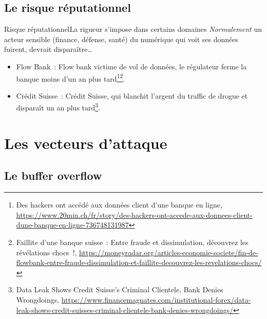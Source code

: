 \documentclass{beamer}
\begin{document}
    \subsection{Le risque réputationnel}\label{subsec:risque-reputationnel}
    \begin{frame}{Risque réputationnel}{La rigueur s'impose dans certains domaines}
        \textit{Normalement} un acteur sensible (finance, défense, santé) du numérique qui voit ses données fuirent, devrait disparaître\ldots
        \begin{itemize}
            \item Flow Bank~: Flow bank victime de vol de données, le régulateur ferme la banque moins d'un an plus tard\footnote{Des hackers ont accédé aux données client d’une banque en ligne, \url{https://www.20min.ch/fr/story/des-hackers-ont-accede-aux-donnees-client-dune-banque-en-ligne-736748131987}}\footnotestep\footnote{Faillite d’une banque suisse~: Entre fraude et dissimulation, découvrez les révélations chocs~!, \url{https://moneyradar.org/articles-economie-societe/fin-de-flowbank-entre-fraude-dissimulation-et-faillite-decouvrez-les-revelations-chocs/}}.
            \item Crédit Suisse~: Crédit Suisse, qui blanchit l'argent du traffic de drogue et disparaît un an plus tard\footnote{Data Leak Shows Credit Suisse’s Criminal Clientele, Bank Denies Wrongdoings, \url{https://www.financemagnates.com/institutional-forex/data-leak-shows-credit-suisses-criminal-clientele-bank-denies-wrongdoings/}}.
        \end{itemize}
    \end{frame}


    \section{Les vecteurs d'attaque}\label{sec:les-vecteurs-dattaque}

    \subsection{Le buffer overflow}\label{subsec:les-buffer-overflow}
\end{document}
